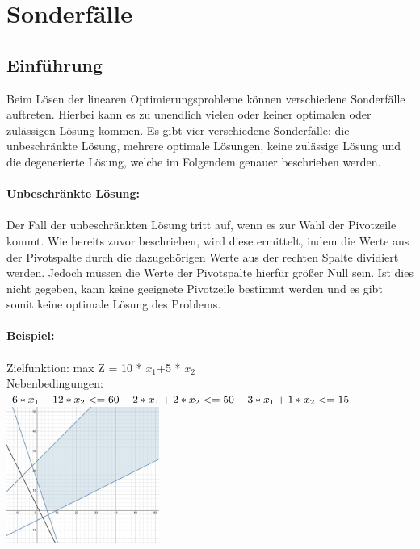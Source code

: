 \section{Sonderfälle}
\subsection{Einführung}
Beim Lösen der linearen Optimierungsprobleme können verschiedene Sonderfälle auftreten. Hierbei kann es zu unendlich vielen oder keiner optimalen oder zulässigen Lösung kommen.
Es gibt vier verschiedene Sonderfälle: die unbeschränkte Lösung, mehrere optimale Lösungen, keine zulässige Lösung und die degenerierte Lösung, welche im Folgendem genauer beschrieben werden.\\\\
\textbf{Unbeschränkte Lösung:}\\\\
Der Fall der unbeschränkten Lösung tritt auf, wenn es zur Wahl der Pivotzeile kommt. Wie bereits zuvor beschrieben, wird diese ermittelt, indem die Werte aus der Pivotspalte durch die dazugehörigen Werte aus der rechten Spalte dividiert werden. Jedoch müssen die Werte der Pivotspalte hierfür größer Null sein. Ist dies nicht gegeben, kann keine geeignete Pivotzeile bestimmt werden und es gibt somit keine optimale Lösung des Problems.
\\\\
\textbf{Beispiel:}\\\\
Zielfunktion: max Z = 10 * $x_1$+5 * $x_2$\\
Nebenbedingungen:\\\begin{math}
6*x_1-12*x_2 <= 60\\
-2*x_1+2*x_2 <= 50\\
-3*x_1 +1*x_2 <= 15\\\end{math}
\includegraphics[width=5cm,right]{images/IMG_unbeschrankte_Losung.jpeg}
\\\\

